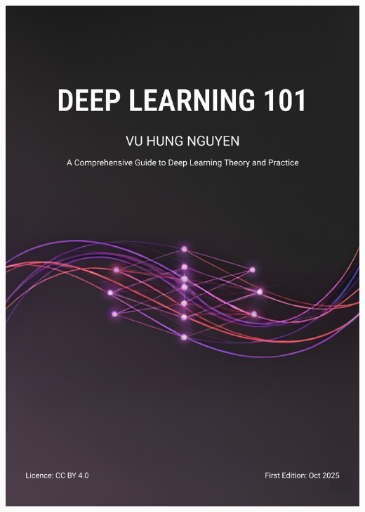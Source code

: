 \documentclass[10pt,\papersize,twoside,openright]{book}
\theoremstyle{definition}
\theoremstyle{remark}
\begin{document}
{{{{{{{              \includegraphics[width=\paperwidth,height=\paperheight]{images/DeepLearning101-cover-B5.png}%
            }{%
              }}}}}}}
\end{document}

